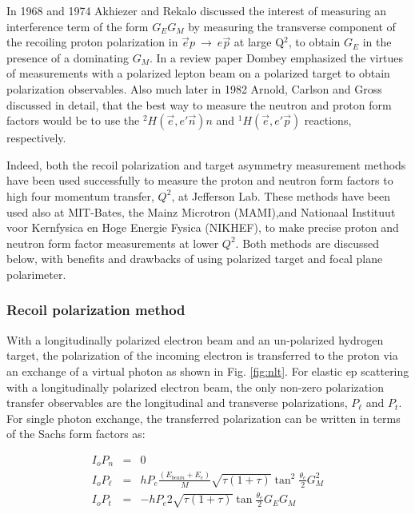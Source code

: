 In 1968 and 1974 Akhiezer and Rekalo \cite{akh1A,akh1B} discussed the interest of measuring 
an interference term of the form  $G_{E}G_{M}$ by measuring the transverse 
component of the recoiling proton polarization in $\vec e p~\rightarrow~e \vec p$  
at large Q$^2$, to obtain $G_E$ in the presence of a dominating $G_M$.
In a review paper Dombey \cite{dombey} emphasized the virtues of measurements with a polarized lepton beam 
on a polarized target to obtain polarization observables. 
Also much later in 1982 Arnold, Carlson and Gross \cite{arnold} discussed in detail, that the best way 
to measure the neutron and proton form factors would be to use the $^2H( \vec e,e' \vec n)n$ 
and $^1H( \vec e,e' \vec p)$ reactions, respectively.

Indeed, both the recoil polarization and target asymmetry measurement methods have
been used successfully to measure the proton and neutron form factors to high 
four momentum transfer, $Q^2$, at Jefferson Lab. These methods have been used also at MIT-Bates, the Mainz 
Microtron (MAMI),and Nationaal Instituut voor Kernfysica en Hoge Energie Fysica (NIKHEF), to make precise 
proton and neutron form factor measurements at lower $Q^2$. Both methods are discussed below, with 
benefits and drawbacks of using polarized target and focal plane polarimeter.  


\subsubsection{Recoil polarization method}

\label{subsubsec:poltrans}

With a longitudinally polarized electron beam and an un-polarized hydrogen target, the 
polarization of the incoming electron is transferred to the proton via an exchange of a virtual photon as 
shown in Fig. \ref{fig:nlt}. 
For elastic ep 
scattering with a longitudinally polarized electron beam, the only non-zero
polarization transfer observables are the longitudinal and transverse
polarizations, $P_{\ell}$ and $P_t$. For single photon exchange, the 
transferred polarization can be written in terms of the Sachs form factors as:

\begin{eqnarray}
I_o P_n & = & 0  \nonumber \\
I_oP_\ell & = & hP_e\frac{(E_{beam}+E_{e})}{M}\sqrt{\tau(1+\tau)}\tan^2\frac{\theta_e}{2}  G_M^2 \nonumber \\ 
I_oP_t & = & -hP_e2 \sqrt{\tau(1+\tau)}\tan\frac{\theta_e}{2} G_EG_M 
\end{eqnarray}

